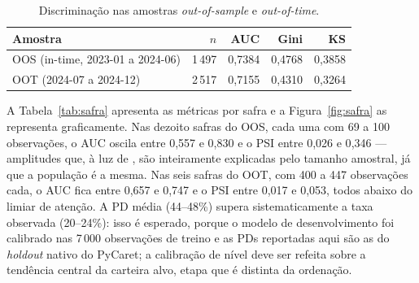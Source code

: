 \documentclass[11pt,a4paper]{article}
\begin{document}
\begin{table}[H]
\centering\small
\caption{Discriminação nas amostras \emph{out-of-sample} e \emph{out-of-time}.}
\label{tab:oos-oot}
\begin{tabular}{lrrrr}
\toprule
Amostra & $n$ & AUC & Gini & KS \\
\midrule
OOS (in-time, 2023-01 a 2024-06) & 1\,497 & 0,7384 & 0,4768 & 0,3858 \\
OOT (2024-07 a 2024-12) & 2\,517 & 0,7155 & 0,4310 & 0,3264 \\
\bottomrule
\end{tabular}
\end{table}

A Tabela~\ref{tab:safra} apresenta as métricas por safra e a Figura~\ref{fig:safra} as representa graficamente. Nas dezoito safras do OOS, cada uma com 69 a 100 observações, o AUC oscila entre 0{,}557 e 0{,}830 e o PSI entre 0{,}026 e 0{,}346 --- amplitudes que, à luz de \citet{yurdakul2018}, são inteiramente explicadas pelo tamanho amostral, já que a população é a mesma. Nas seis safras do OOT, com 400 a 447 observações cada, o AUC fica entre 0{,}657 e 0{,}747 e o PSI entre 0{,}017 e 0{,}053, todos abaixo do limiar de atenção. A PD média (44--48\%) supera sistematicamente a taxa observada (20--24\%): isso é esperado, porque o modelo de desenvolvimento foi calibrado nas 7\,000 observações de treino e as PDs reportadas aqui são as do \emph{holdout} nativo do PyCaret; a calibração de nível deve ser refeita sobre a tendência central da carteira alvo, etapa que é distinta da ordenação.
\end{document}
